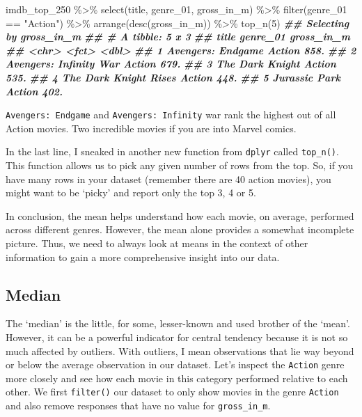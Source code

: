 \documentclass[
]{book}
\newenvironment{Shaded}{\begin{snugshade}}{\end{snugshade}}
\newcommand{\DecValTok}[1]{\textcolor[rgb]{0.00,0.00,0.81}{#1}}
\newcommand{\DocumentationTok}[1]{\textcolor[rgb]{0.56,0.35,0.01}{\textbf{\textit{#1}}}}
\newcommand{\FunctionTok}[1]{\textcolor[rgb]{0.00,0.00,0.00}{#1}}
\newcommand{\NormalTok}[1]{#1}
\newcommand{\SpecialCharTok}[1]{\textcolor[rgb]{0.00,0.00,0.00}{#1}}
\newcommand{\StringTok}[1]{\textcolor[rgb]{0.31,0.60,0.02}{#1}}
\begin{document}
\begin{Shaded}
\begin{Highlighting}[]
\NormalTok{imdb\_top\_250 }\SpecialCharTok{\%\textgreater{}\%} 
  \FunctionTok{select}\NormalTok{(title, genre\_01, gross\_in\_m) }\SpecialCharTok{\%\textgreater{}\%} 
  \FunctionTok{filter}\NormalTok{(genre\_01 }\SpecialCharTok{==} \StringTok{"Action"}\NormalTok{) }\SpecialCharTok{\%\textgreater{}\%} 
  \FunctionTok{arrange}\NormalTok{(}\FunctionTok{desc}\NormalTok{(gross\_in\_m)) }\SpecialCharTok{\%\textgreater{}\%} 
  \FunctionTok{top\_n}\NormalTok{(}\DecValTok{5}\NormalTok{)}
\DocumentationTok{\#\# Selecting by gross\_in\_m}
\DocumentationTok{\#\# \# A tibble: 5 x 3}
\DocumentationTok{\#\#   title                  genre\_01 gross\_in\_m}
\DocumentationTok{\#\#   \textless{}chr\textgreater{}                  \textless{}fct\textgreater{}         \textless{}dbl\textgreater{}}
\DocumentationTok{\#\# 1 Avengers: Endgame      Action         858.}
\DocumentationTok{\#\# 2 Avengers: Infinity War Action         679.}
\DocumentationTok{\#\# 3 The Dark Knight        Action         535.}
\DocumentationTok{\#\# 4 The Dark Knight Rises  Action         448.}
\DocumentationTok{\#\# 5 Jurassic Park          Action         402.}
\end{Highlighting}
\end{Shaded}

\texttt{Avengers:\ Endgame} and \texttt{Avengers:\ Infinity} war rank the highest out of all Action movies. Two incredible movies if you are into Marvel comics.

In the last line, I sneaked in another new function from \texttt{dplyr} called \texttt{top\_n()}. This function allows us to pick any given number of rows from the top. So, if you have many rows in your dataset (remember there are 40 action movies), you might want to be `picky' and report only the top 3, 4 or 5.

In conclusion, the mean helps understand how each movie, on average, performed across different genres. However, the mean alone provides a somewhat incomplete picture. Thus, we need to always look at means in the context of other information to gain a more comprehensive insight into our data.

\hypertarget{median}{%
\subsection{Median}\label{median}}

The `median' is the little, for some, lesser-known and used brother of the `mean'. However, it can be a powerful indicator for central tendency because it is not so much affected by outliers. With outliers, I mean observations that lie way beyond or below the average observation in our dataset. Let's inspect the \texttt{Action} genre more closely and see how each movie in this category performed relative to each other. We first \texttt{filter()} our dataset to only show movies in the genre \texttt{Action} and also remove responses that have no value for \texttt{gross\_in\_m}.
\end{document}
